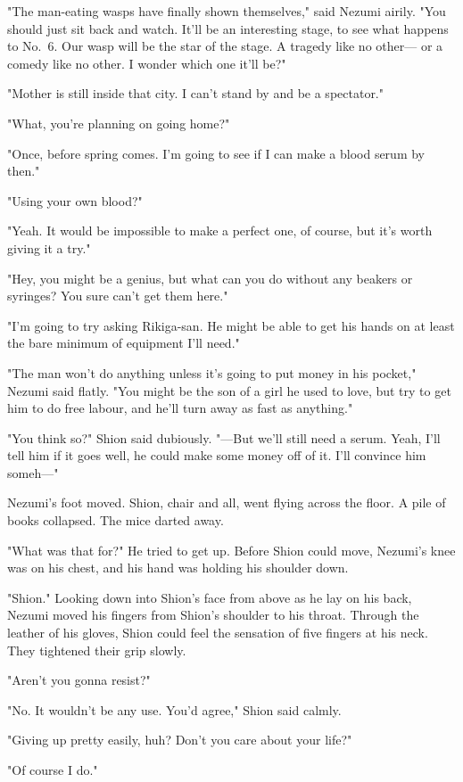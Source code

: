 "The man-eating wasps have finally shown themselves," said Nezumi
airily. "You should just sit back and watch. It'll be an interesting
stage, to see what happens to No.~6. Our wasp will be the star of the
stage. A tragedy like no other--- or a comedy like no other. I wonder
which one it'll be?"

"Mother is still inside that city. I can't stand by and be a spectator."

"What, you're planning on going home?"

"Once, before spring comes. I'm going to see if I can make a blood serum
by then."

"Using your own blood?"

"Yeah. It would be impossible to make a perfect one, of course, but it's
worth giving it a try."

"Hey, you might be a genius, but what can you do without any beakers or
syringes? You sure can't get them here."

"I'm going to try asking Rikiga-san. He might be able to get his hands
on at least the bare minimum of equipment I'll need."

"The man won't do anything unless it's going to put money in his
pocket," Nezumi said flatly. "You might be the son of a girl he used to
love, but try to get him to do free labour, and he'll turn away as fast
as anything."

"You think so?" Shion said dubiously. "---But we'll still need a serum.
Yeah, I'll tell him if it goes well, he could make some money off of it.
I'll convince him someh---"

Nezumi's foot moved. Shion, chair and all, went flying across the floor.
A pile of books collapsed. The mice darted away.

"What was that for?" He tried to get up. Before Shion could move,
Nezumi's knee was on his chest, and his hand was holding his shoulder
down.

"Shion." Looking down into Shion's face from above as he lay on his
back, Nezumi moved his fingers from Shion's shoulder to his throat.
Through the leather of his gloves, Shion could feel the sensation of
five fingers at his neck. They tightened their grip slowly.

"Aren't you gonna resist?"

"No. It wouldn't be any use. You'd agree," Shion said calmly.

"Giving up pretty easily, huh? Don't you care about your life?"

"Of course I do."

